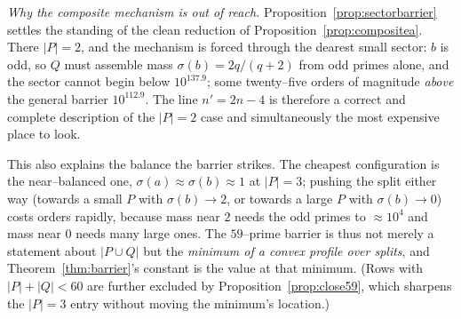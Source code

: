 \documentclass[11pt]{article}
\theoremstyle{definition}
\begin{document}
\emph{Why the composite mechanism is out of reach.} Proposition~\ref{prop:sectorbarrier} settles the standing of the clean reduction of
Proposition~\ref{prop:compositea}. There $|P|=2$, and the mechanism is forced through the dearest
small sector: $b$ is odd, so $Q$ must assemble mass $\sigma(b)=2q/(q+2)$ from odd primes alone, and
the sector cannot begin below $10^{137.9}$; some twenty--five orders of magnitude \emph{above} the
general barrier $10^{112.9}$. The line $n'=2n-4$ is therefore a correct and complete description of
the $|P|=2$ case and simultaneously the most expensive place to look.

This also explains the balance the barrier strikes. The cheapest configuration is the near--balanced
one, $\sigma(a)\approx\sigma(b)\approx1$ at $|P|=3$; pushing the split either way (towards a small
$P$ with $\sigma(b)\to2$, or towards a large $P$ with $\sigma(b)\to0$) costs orders rapidly, because
mass near $2$ needs the odd primes to $\approx10^4$ and mass near $0$ needs many large ones. The
$59$--prime barrier is thus not merely a statement about $|P\cup Q|$ but the \emph{minimum of a
convex profile over splits}, and Theorem~\ref{thm:barrier}'s constant is the value at that minimum.
(Rows with $|P|+|Q|<60$ are further excluded by Proposition~\ref{prop:close59}, which sharpens the
$|P|=3$ entry without moving the minimum's location.)
\end{document}
